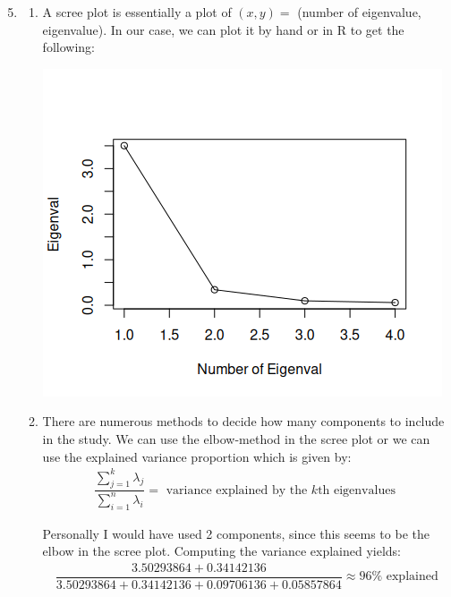 \begin{enumerate}[label=\arabic*.,leftmargin=*]
  \setcounter{enumi}{4}
  \item 
  \begin{enumerate}[label=\alph*),leftmargin=*]
    \item A scree plot is essentially a plot of $(x,y) = $ (number of eigenvalue, eigenvalue). In our case, we can plot it by hand or in R to get the following:
      \begin{center}
        \includegraphics[scale=0.7]{./figures/scree_plot.png}
      \end{center}
      \par\bigskip
    \item There are numerous methods to decide how many components to include in the study. We can use the elbow-method in the scree plot or we can use the explained variance proportion which is given by:
      \begin{equation*}
        \begin{gathered}
          \dfrac{\sum_{j=1}^{k}\lambda_j}{\sum_{i=1}^{n}\lambda_i} = \text{ variance explained by the $k$th eigenvalues }
        \end{gathered}
      \end{equation*}
      \par\bigskip
      \noindent Personally I would have used 2 components, since this seems to be the elbow in the scree plot. Computing the variance explained yields:
      \begin{equation*}
        \begin{gathered}
          \dfrac{3.50293864+0.34142136}{3.50293864+0.34142136+0.09706136+0.05857864} \approx 96\%\text{ explained}

\end{gathered}
\end{equation*}
\end{enumerate}
\end{enumerate}

